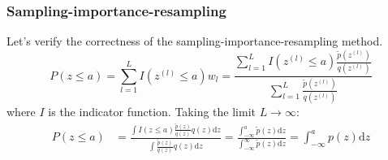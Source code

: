 \documentclass{beamer}
\begin{document}
\begin{frame}
    \frametitle{Sampling-importance-resampling}
    Let's verify the correctness of the sampling-importance-resampling method.
    \begin{equation*}
        P(z\le{}a)=\sum_{l=1}^{L}I(z^{(l)}\le{}a)w_{l}=\frac{\sum_{l=1}^{L}I(z^{(l)}\le{}a)\frac{\tilde{p}(z^{(l)})}{q(z^{(l)})}}{\sum_{l=1}^{L}\frac{\tilde{p}(z^{(l)})}{q(z^{(l)})}}
    \end{equation*}
    where $I$ is the indicator function. Taking the limit $L\to\infty$:
    \begin{align*}
        P(z\le{}a)&=\frac{\int{}I(z\le{}a)\frac{\tilde{p}(z)}{q(z)}q(z)\mathrm{d}z}{\int\frac{\tilde{p}(z)}{q(z)}q(z)\mathrm{d}z}=\frac{\int_{-\infty}^{a}\tilde{p}(z)\mathrm{d}z}{\int_{-\infty}^{\infty}\tilde{p}(z)\mathrm{d}z}=\int_{-\infty}^{a}p(z)\mathrm{d}z
    \end{align*}
\end{frame}
\end{document}

